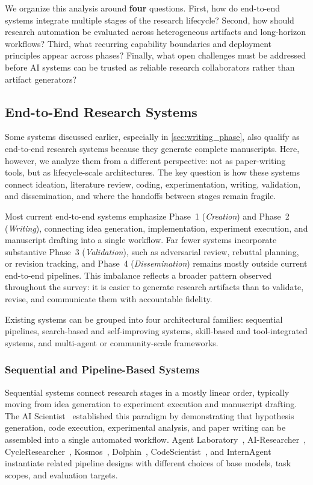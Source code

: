 \documentclass{llmxive}
\begin{document}
We organize this analysis around \textbf{four} questions. First, how do end-to-end systems integrate multiple stages of the research lifecycle? Second, how should research automation be evaluated across heterogeneous artifacts and long-horizon workflows? Third, what recurring capability boundaries and deployment principles appear across phases? Finally, what open challenges must be addressed before AI systems can be trusted as reliable research collaborators rather than artifact generators?



\subsection{End-to-End Research Systems}
\label{sec:e2e_systems}

Some systems discussed earlier, especially in \cref{sec:writing_phase}, also qualify as end-to-end research systems because they generate complete manuscripts. Here, however, we analyze them from a different perspective: not as paper-writing tools, but as lifecycle-scale architectures. The key question is how these systems connect ideation, literature review, coding, experimentation, writing, validation, and dissemination, and where the handoffs between stages remain fragile.

Most current end-to-end systems emphasize Phase~1 (\emph{Creation}) and Phase~2 (\emph{Writing}), connecting idea generation, implementation, experiment execution, and manuscript drafting into a single workflow. Far fewer systems incorporate substantive Phase~3 (\emph{Validation}), such as adversarial review, rebuttal planning, or revision tracking, and Phase~4 (\emph{Dissemination}) remains mostly outside current end-to-end pipelines. This imbalance reflects a broader pattern observed throughout the survey: it is easier to generate research artifacts than to validate, revise, and communicate them with accountable fidelity. 

Existing systems can be grouped into four architectural families: sequential pipelines, search-based and self-improving systems, skill-based and tool-integrated systems, and multi-agent or community-scale frameworks.



\subsubsection{Sequential and Pipeline-Based Systems}

Sequential systems connect research stages in a mostly linear order, typically moving from idea generation to experiment execution and manuscript drafting. The AI Scientist~\cite{lu2024aiscientist} established this paradigm by demonstrating that hypothesis generation, code execution, experimental analysis, and paper writing can be assembled into a single automated workflow. Agent Laboratory~\cite{schmidgall2025agentlab}, AI-Researcher~\cite{airesearcher2025}, CycleResearcher~\cite{cycleresearcher2024}, Kosmos~\cite{kosmos2025}, Dolphin~\cite{dolphin2025}, CodeScientist~\cite{codescientist2025}, and InternAgent~\cite{novelseek2025} instantiate related pipeline designs with different choices of base models, task scopes, and evaluation targets.
\end{document}

